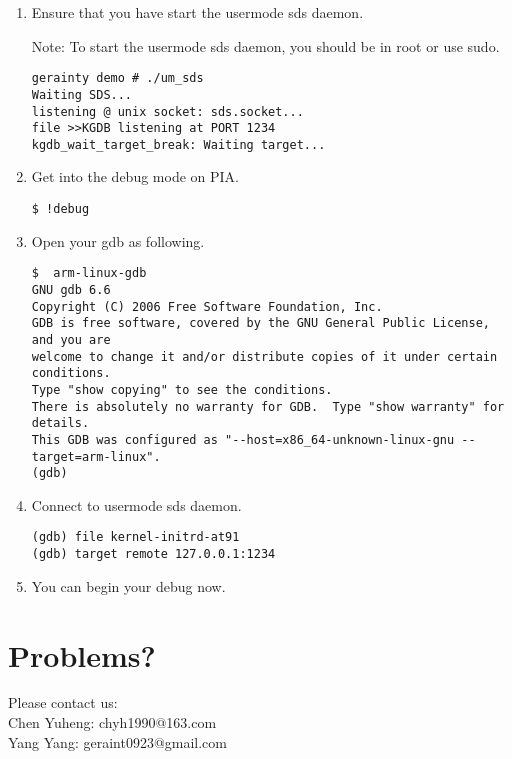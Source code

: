 \documentclass[a4paper]{article}
\begin{document}
\begin{enumerate}
\item Ensure that you have start the usermode sds daemon.

Note: To start the usermode sds daemon, you should be in root or use sudo.
\begin{verbatim}
gerainty demo # ./um_sds 
Waiting SDS...
listening @ unix socket: sds.socket...
file >>KGDB listening at PORT 1234
kgdb_wait_target_break: Waiting target...
\end{verbatim}

\item Get into the debug mode on PIA.


\begin{verbatim}
$ !debug
\end{verbatim}

\item Open your gdb as following.

{
\footnotesize
\begin{verbatim}
$  arm-linux-gdb
GNU gdb 6.6
Copyright (C) 2006 Free Software Foundation, Inc.
GDB is free software, covered by the GNU General Public License, and you are
welcome to change it and/or distribute copies of it under certain conditions.
Type "show copying" to see the conditions.
There is absolutely no warranty for GDB.  Type "show warranty" for details.
This GDB was configured as "--host=x86_64-unknown-linux-gnu --target=arm-linux".
(gdb) 
\end{verbatim}

}
\item Connect to usermode sds daemon.

\begin{verbatim}
(gdb) file kernel-initrd-at91
(gdb) target remote 127.0.0.1:1234
\end{verbatim}

\item You can begin your debug now.

\end{enumerate}

\section{Problems?}
Please contact us: \\
Chen Yuheng: chyh1990@163.com\\
Yang Yang: geraint0923@gmail.com
\end{document}
